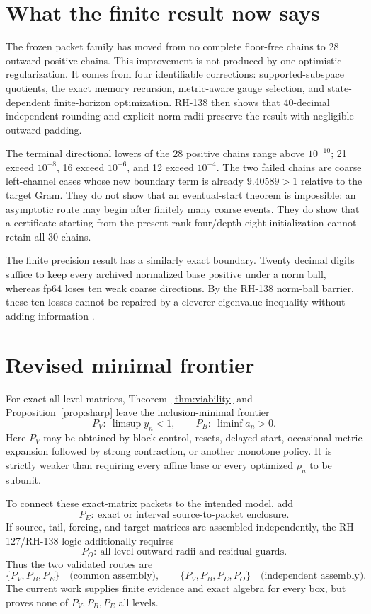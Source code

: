 \documentclass[12pt]{article}
\begin{document}
\section{What the finite result now says}
The frozen packet family has moved from no complete floor-free chains to 28
outward-positive chains.  This improvement is not produced by one optimistic
regularization.  It comes from four identifiable corrections:
supported-subspace quotients, the exact memory recursion, metric-aware gauge
selection, and state-dependent finite-horizon optimization.  RH-138 then
shows that 40-decimal independent rounding and explicit norm radii preserve
the result with negligible outward padding.

The terminal directional lowers of the 28 positive chains range above
$10^{-10}$; 21 exceed $10^{-8}$, 16 exceed $10^{-6}$, and 12 exceed
$10^{-4}$.  The two failed chains are coarse left-channel cases whose new
boundary term is already $9.40589>1$ relative to the target Gram.  They do not
show that an eventual-start theorem is impossible: an asymptotic route may
begin after finitely many coarse events.  They do show that a certificate
starting from the present rank-four/depth-eight initialization cannot retain
all 30 chains.

The finite precision result has a similarly exact boundary.  Twenty decimal
digits suffice to keep every archived normalized base positive under a norm
ball, whereas fp64 loses ten weak coarse directions.  By the RH-138
norm-ball barrier, these ten losses cannot be repaired by a cleverer
eigenvalue inequality without adding information \citep{Bhatia1997,
HornJohnson1991,Moore1966}.

\section{Revised minimal frontier}
For exact all-level matrices, Theorem~\ref{thm:viability} and
Proposition~\ref{prop:sharp} leave the inclusion-minimal frontier
\[
 \boxed{P_V:\ \limsup y_n<1},
 \qquad
 \boxed{P_B:\ \liminf a_n>0}.
\]
Here $P_V$ may be obtained by block control, resets, delayed start, occasional
metric expansion followed by strong contraction, or another monotone policy.
It is strictly weaker than requiring every affine base or every optimized
$\rho_n$ to be subunit.

To connect these exact-matrix packets to the intended model, add
\[
 \boxed{P_E:\ \text{exact or interval source-to-packet enclosure}}.
\]
If source, tail, forcing, and target matrices are assembled independently,
the RH-127/RH-138 logic additionally requires
\[
 \boxed{P_O:\ \text{all-level outward radii and residual guards}}.
\]
Thus the two validated routes are
\[
 \{P_V,P_B,P_E\}\quad\text{(common assembly)},
 \qquad
 \{P_V,P_B,P_E,P_O\}\quad\text{(independent assembly)}.
\]
The current work supplies finite evidence and exact algebra for every box,
but proves none of $P_V,P_B,P_E$ all levels.
\end{document}
